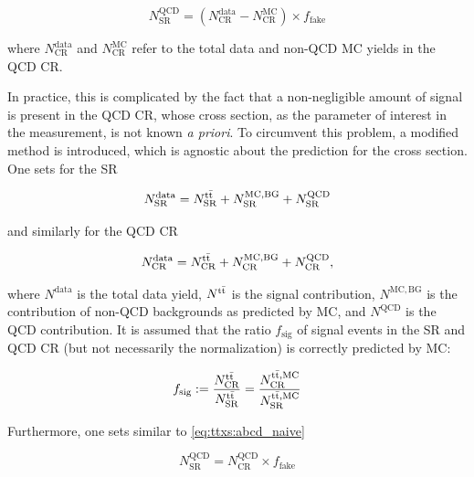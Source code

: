 \begin{equation}
\label{eq:ttxs:abcd_naive}
    N_{\text{SR}}^{\text{QCD}} = ( N_{\text{CR}}^{\text{data}} - N_{\text{CR}}^{\text{MC}} ) \times f_{\mathrm{fake}}
\end{equation}

\noindent where $N_{\text{CR}}^{\text{data}}$ and $N_{\text{CR}}^{\text{MC}}$ refer to the total data and non-QCD MC yields in the QCD CR.

In practice, this is complicated by the fact that a non-negligible amount of \ttbar signal is present in the QCD CR, whose cross section, as the parameter of interest in the measurement, is not known \textit{a priori}. %
To circumvent this problem, a modified method is introduced, which is agnostic about the prediction for the \ttbar cross section. 
One sets for the SR

\begin{equation}
\label{eq:ttxs:abcd_modified1}
    N^{\mathrm{data}}_{\mathrm{SR}} = N^{\mathrm{t \bar{t}}}_{\mathrm{SR}}+ N^{\mathrm{MC,BG}}_{\mathrm{SR}} + N^{\mathrm{QCD}}_{\mathrm{SR}}
\end{equation}

\noindent and similarly for the QCD CR

\begin{equation}
\label{eq:ttxs:abcd_modified2}
    N^{\mathrm{data}}_{\mathrm{CR}} = N^{\mathrm{t \bar{t}}}_{\mathrm{CR}} + N^{\mathrm{MC,BG}}_{\mathrm{CR}} + N^{\mathrm{QCD}}_{\mathrm{CR}},
\end{equation}

\noindent where $N^{\mathrm{data}}$ is the total data yield, $N^{\mathrm{t \bar{t}}}$ is the \ttbar signal contribution, $N^{\mathrm{MC,BG}}$ is the contribution of non-QCD backgrounds as predicted by MC, and $N^{\mathrm{QCD}}$ is the QCD contribution. It is assumed that the ratio $f_{\mathrm{sig}}$ of signal events in the SR and QCD CR (but not necessarily the normalization) is correctly predicted by MC:

\begin{equation}
\label{eq:ttxs:abcd_modified3}
    f_{\mathrm{sig}} := \frac{ N^{\mathrm{t \bar{t}}}_{\mathrm{CR}} }{ N^{\mathrm{t \bar{t}}}_{\mathrm{SR}} } = \frac{ N^{\mathrm{\mathrm{t \bar{t}},MC}}_{\mathrm{CR}} }{ N^{\mathrm{\mathrm{t \bar{t}},MC}}_{\mathrm{SR}} }
\end{equation}

Furthermore, one sets similar to \cref{eq:ttxs:abcd_naive}

\begin{equation}
\label{eq:ttxs:abcd_modified4}
    N^{\mathrm{QCD}}_{\mathrm{SR}} = N^{\mathrm{QCD}}_{\mathrm{CR}} \times f_{\mathrm{fake}}
\end{equation}

